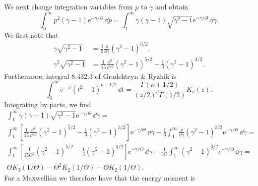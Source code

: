 \documentclass{notes}
\newcommand{\ee}{\mathrm{e}}
\begin{document}
    We next change integration variables from $p$ to $\gamma$ and obtain
    \begin{equation}
        \int_0^\infty p^2\left(\gamma-1\right) \ee^{-\gamma/\Theta}\,\dd p =
        \int_1^\infty \gamma\left(\gamma-1\right)\sqrt{\gamma^2-1}\ee^{-\gamma/\Theta}\,\dd\gamma.
    \end{equation}
    We first note that
    \begin{equation}
        \begin{aligned}
            \gamma\sqrt{\gamma^2-1} &= \frac{1}{3}\frac{\dd}{\dd\gamma}\left( \gamma^2 - 1\right)^{3/2},\\
            \gamma^2\sqrt{\gamma^2-1} &= \frac{1}{15}\frac{\dd^2}{\dd\gamma^2}\left( \gamma^2-1 \right)^{5/2}
            - \frac{1}{3}\left( \gamma^2-1 \right)^{3/2}.
        \end{aligned}
    \end{equation}
    Furthermore, integral 8.432.3 of Gradshteyn \& Ryzhik is
    \begin{equation}
        \int_0^\infty \ee^{-zt}\left( t^2-1 \right)^{\nu-1/2}\,\dd t =
        \frac{\Gamma\left(\nu+1/2\right)}{\left(z/2\right)^\nu\Gamma\left(1/2\right)} K_\nu(z).
    \end{equation}
    Integrating by parts, we find
    \begin{equation}
        \begin{gathered}
            \int_1^\infty \gamma\left(\gamma-1\right)\sqrt{\gamma^2-1}\ee^{-\gamma/\Theta}\,\dd\gamma =\\
            \int_1^\infty \left[
                \frac{1}{15}\frac{\dd^2}{\dd\gamma^2}\left( \gamma^2-1 \right)^{5/2}
                - \frac{1}{3}\left( \gamma^2-1 \right)^{3/2}
            \right] \ee^{-\gamma/\Theta}\,\dd\gamma - 
            \frac{1}{3}\int_1^\infty\frac{\dd}{\dd\gamma}\left( \gamma^2 - 1\right)^{3/2} \ee^{-\gamma/\Theta}\,\dd\gamma =\\
            \int_1^\infty\left[ \frac{1}{15\Theta^2}\left(\gamma^2-1\right)^{5/2} -
                \frac{1}{3}\left( \gamma^2 - 1\right)^{3/2} \right] \ee^{-\gamma/\Theta}\,\dd\gamma -
            \frac{1}{3\Theta}\int_1^\infty \left( \gamma^2 - 1\right)^{3/2} e^{-\gamma/\Theta}\,\dd\gamma =\\
            \Theta K_3(1/\Theta) - \Theta^2 K_2(1/\Theta) - \Theta K_2(1/\Theta).
        \end{gathered}
    \end{equation}
    For a Maxwellian we therefore have that the energy moment is
\end{document}
